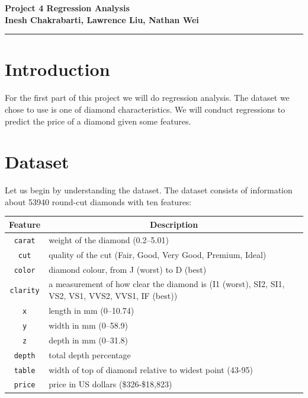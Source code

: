 \documentclass[11pt,letterpaper]{article}
\begin{document}

\begin{center}
    \begin{minipage}{10cm}
    	\begin{center}
    	\textbf{\large Project 4 Regression Analysis}\\[0.1cm]
        \textbf{Inesh Chakrabarti, Lawrence Liu, Nathan Wei}\\[0.1cm]
    	\end{center}
    \end{minipage}\hfill
\end{center}

\rule{17cm}{0.1mm}


\section*{Introduction}
For the first part of this project we will do regression analysis. The dataset 
we chose to use is one of diamond characteristics. We will conduct regressions
to predict the price of a diamond given some features. 


\section*{Dataset}
Let us begin by understanding the dataset. The dataset consists of information
about 53940 round-cut diamonds with ten features: 
\begin{table}[ht]

\label{table1} 
\begin{tabular}{cl} 
\hline
\multicolumn{1}{c}{Feature} & \multicolumn{1}{c}{Description}\\
\hline 
    \texttt{carat} & weight of the diamond (0.2–5.01) \\
    \texttt{cut} & quality of the cut (Fair, Good, Very Good, Premium, Ideal) \\
    \texttt{color} & diamond colour, from J (worst) to D (best) \\
    \texttt{clarity} & a measurement of how clear the diamond is (I1 (worst),  
    SI2, SI1, VS2, VS1, VVS2, VVS1, IF (best)) \\
    \texttt{x} & length in mm (0–10.74) \\
    \texttt{y} & width in mm (0–58.9) \\
    \texttt{z} & depth in mm (0–31.8) \\
    \texttt{depth} & total depth percentage \\
    \texttt{table} & width of top of diamond relative to widest point (43-95) \\
    \texttt{price} & price in US dollars (\$326-\$18,823)
\end{tabular}
\end{table}
\end{document}

